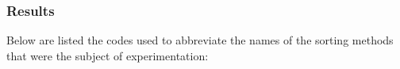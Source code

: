 
%
\subsubsection{Results}

Below are listed the codes used to abbreviate the names of the sorting methods that were the subject of experimentation:


